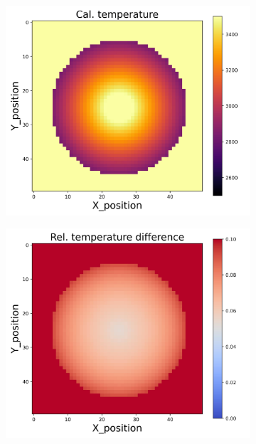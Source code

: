 \begin{figure}[htbp]
    \centering
    \begin{minipage}{\textwidth}
        \centering
        \begin{subfigure}{0.325\textwidth}
            \centering
            \includegraphics[width=\textwidth]{figures/raw_data/21/T3500/linear/T_cal.jpg}
        \end{subfigure}
        \begin{subfigure}{0.325\textwidth}
            \centering
            \includegraphics[width=\textwidth]{figures/raw_data/21/T3500/linear/T_bias.jpg}

\end{subfigure}
\end{minipage}
\end{figure}
